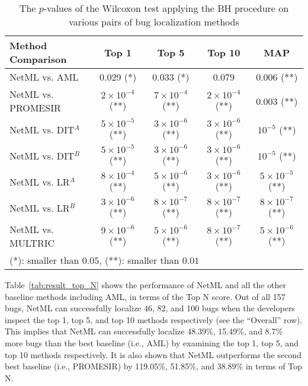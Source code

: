 \begin{table*}[!t]
	\centering
	\caption{The $p$-values of the Wilcoxon test applying the BH procedure on various pairs of bug localization methods}
	\begin{tabular}{|l|c|c|c|c|}
		\hline
		\textbf{Method Comparison} & \textbf{Top 1} & \textbf{Top 5} & \textbf{Top 10} & \textbf{MAP}\\
		\hline\hline
		NetML vs. AML & 0.029 (*) & 0.033 (*) & 0.079 & 0.006 (**)\\
		NetML vs. PROMESIR & $2 \times 10^{-4}$ (**) & $7 \times 10^{-4}$ (**) & $2 \times 10^{-4}$ (**) &  0.003 (**)  \\
		NetML vs. DIT$^A$  & $5 \times 10^{-5}$ (**) & $3 \times 10^{-6}$ (**) & $3 \times 10^{-6}$ (**) & $10^{-5}$ (**)   \\
		NetML vs. DIT$^B$   & $5 \times 10^{-5}$ (**) & $3 \times 10^{-6}$ (**) & $3 \times 10^{-6}$ (**) & $10^{-5}$ (**)   \\
		NetML vs. LR$^A$    & $8 \times 10^{-4}$ (**) & $5 \times 10^{-6}$ (**) & $3 \times 10^{-6}$ (**) & $5 \times 10^{-5}$ (**) \\
		NetML vs. LR$^B$     & $3 \times 10^{-6}$ (**) & $8 \times 10^{-7}$ (**) & $8 \times 10^{-7}$ (**) & $8 \times 10^{-7}$ (**) \\
		NetML vs. MULTRIC  & $9 \times 10^{-6}$ (**) & $5 \times 10^{-6}$ (**) & $8 \times 10^{-7}$ (**)  & $5 \times 10^{-6}$ (**)   \\
		\hline
		\multicolumn{5}{l}{(*): smaller than $0.05$, (**): smaller than $0.01$}
	\end{tabular}
	\label{tab:wilcoxon_methods}
\end{table*}

Table~\ref{tab:result_top_N} shows the performance of NetML and all the other baseline methods including AML, in terms of the Top N score. Out of all 157 bugs, NetML can successfully localize 46, 82, and 100 bugs when the developers inspect the top 1, top 5, and top 10 methods respectively (see the ``Overall'' row). This implies that NetML can successfully localize 48.39\%, 15.49\%, and 8.7\% more bugs than the best baseline (i.e., AML) by examining the top 1, top 5, and top 10 methods respectively. It is also shown that NetML outperforms the second best baseline (i.e., PROMESIR) by 119.05\%, 51.85\%, and 38.89\% in terms of Top N.


